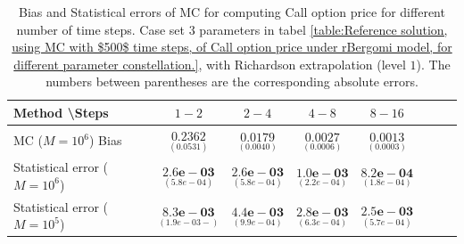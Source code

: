 \documentclass[11pt]{article}
\begin{document}
\begin{table}[h!]
	\centering
	\begin{tabular}{l*{6}{c}r}
		Method \textbackslash  Steps            & $1-2$ & $2-4$ & $4-8$ & $8-16$  \\
		\hline
		MC ($M=10^6$)  Bias   &$\underset{(    0.0531)}{\mathbf{0.2362}}$  & $\underset{( 0.0040)}{\mathbf{0.0179}}$  & $\underset{(  0.0006)}{\mathbf{0.0027}}$  & $\underset{(0.0003 )}{\mathbf{0.0013}}$ \\	
		
		Statistical error ($M=10^6$)    & $\underset{( 5.8e-04)}{\mathbf{2.6e-03}}$  &  $\underset{( 5.8e-04)}{\mathbf{2.6e-03}}$ & $\underset{( 2.2e-04)}{\mathbf{1.0e-03}}$ & $\underset{(1.8e-04 )}{\mathbf{ 8.2e-04}}$ \\
		
		Statistical error ($M=10^5$)    & $\underset{(1.9e-03 -)}{\mathbf{8.3e-03}}$  &  $\underset{(9.9e-04)}{\mathbf{4.4e-03}}$ & $\underset{(6.3e-04)}{\mathbf{2.8e-03}}$ & $\underset{(5.7e-04 )}{\mathbf{2.5e-03}}$ \\	
		\hline
	\end{tabular}
	\caption{Bias and Statistical errors of MC  for computing Call option price  for different number of time steps. Case set $3$ parameters in tabel \ref{table:Reference solution, using MC with $500$ time steps, of Call option price under rBergomi model, for different parameter constellation.}, with Richardson extrapolation (level $1$). The numbers between parentheses are the corresponding absolute errors.}
	\label{Bias and Statistical errors of MC ($M=10^6$)  for computing Call option price  for different number of time steps. Case set $3$ parameters, with Richardson extrapolation (level1). The numbers between parentheses are the corresponding absolute errors.}
\end{table}
\end{document}
